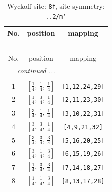 \documentclass[fleqn,8pt]{jsarticle}
\begin{document}
\begin{longtable}{ccc}
\caption{Wyckoff site: {\tt 8f}, site symmetry: {\tt ..2/m'}}
 \\
 \hline \hline
No. & position & mapping \\ \hline \endfirsthead

\multicolumn{2}{l}{\tablename\ \thetable{}} \\
 \hline \hline
No. & position & mapping \\ \hline \endhead

 \hline \hline
\multicolumn{2}{r}{\footnotesize\it continued ...} \\ \endfoot

 \hline \hline
\multicolumn{2}{r}{} \\ \endlastfoot

1 & $\left[ \frac{1}{4},\, \frac{1}{4},\, \frac{1}{4} \right]$ & {\tt [1,12,24,29]} \\ \hline
2 & $\left[ \frac{1}{4},\, \frac{3}{4},\, \frac{1}{4} \right]$ & {\tt [2,11,23,30]} \\ \hline
3 & $\left[ \frac{3}{4},\, \frac{1}{4},\, \frac{1}{4} \right]$ & {\tt [3,10,22,31]} \\ \hline
4 & $\left[ \frac{3}{4},\, \frac{3}{4},\, \frac{1}{4} \right]$ & {\tt [4,9,21,32]} \\ \hline
5 & $\left[ \frac{3}{4},\, \frac{3}{4},\, \frac{3}{4} \right]$ & {\tt [5,16,20,25]} \\ \hline
6 & $\left[ \frac{3}{4},\, \frac{1}{4},\, \frac{3}{4} \right]$ & {\tt [6,15,19,26]} \\ \hline
7 & $\left[ \frac{1}{4},\, \frac{3}{4},\, \frac{3}{4} \right]$ & {\tt [7,14,18,27]} \\ \hline
8 & $\left[ \frac{1}{4},\, \frac{1}{4},\, \frac{3}{4} \right]$ & {\tt [8,13,17,28]} \\
\end{longtable}
\renewcommand{\arraystretch}{1.2}
\end{document}
